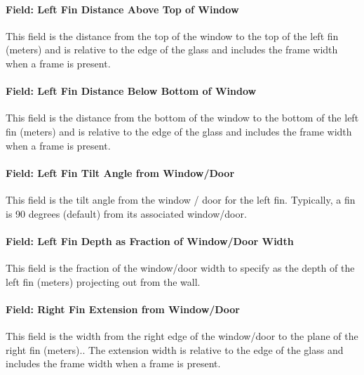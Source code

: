 \paragraph{Field: Left Fin Distance Above Top of Window}\label{field-left-fin-distance-above-top-of-window-1}

This field is the distance from the top of the window to the top of the left fin (meters) and is relative to the edge of the glass and includes the frame width when a frame is present.

\paragraph{Field: Left Fin Distance Below Bottom of Window}\label{field-left-fin-distance-below-bottom-of-window-1}

This field is the distance from the bottom of the window to the bottom of the left fin (meters) and is relative to the edge of the glass and includes the frame width when a frame is present.

\paragraph{Field: Left Fin Tilt Angle from Window/Door}\label{field-left-fin-tilt-angle-from-windowdoor-1}

This field is the tilt angle from the window / door for the left fin. Typically, a fin is 90 degrees (default) from its associated window/door.

\paragraph{Field: Left Fin Depth as Fraction of Window/Door Width}\label{field-left-fin-depth-as-fraction-of-windowdoor-width}

This field is the fraction of the window/door width to specify as the depth of the left fin (meters) projecting out from the wall.

\paragraph{Field: Right Fin Extension from Window/Door}\label{field-right-fin-extension-from-windowdoor-1}

This field is the width from the right edge of the window/door to the plane of the right fin (meters).. The extension width is relative to the edge of the glass and includes the frame width when a frame is present.

